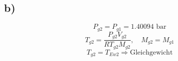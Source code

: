 

\subsection*{b)}
\[
P_{g2} = P_{g1} = 1.40094 \text{ bar}
\]
\[
T_{g2} = \frac{P_{g2} V_{g2}}{R T_{g2} M_{g2}}, \quad M_{g2} = M_{g1}
\]
\[
T_{g2} = T_{Ew2} \Rightarrow \text{Gleichgewicht}
\]